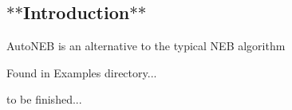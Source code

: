 \subsection*{$\ast$$\ast$\+Introduction$\ast$$\ast$}

Auto\+N\+EB is an alternative to the typical N\+EB algorithm

Found in Examples directory...

to be finished... 